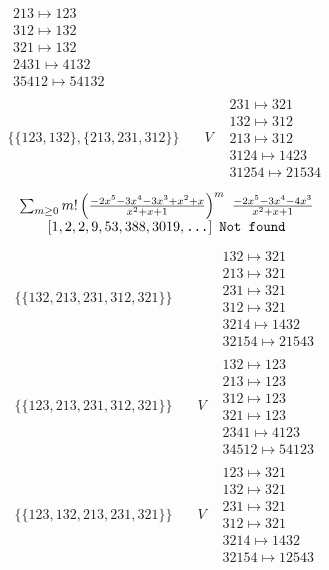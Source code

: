 \begin{tiny}
\begin{align}
\begin{matrix}
213 \mapsto 123\\312 \mapsto 132\\321 \mapsto 132\\2431 \mapsto 4132\\35412 \mapsto 54132
\end{matrix}
\\
\{\{123, 132\}, \{213, 231, 312\}\}
\quad
&
V
&
\begin{matrix}
231 \mapsto 321\\132 \mapsto 312\\213 \mapsto 312\\3124 \mapsto 1423\\31254 \mapsto 21534
\end{matrix}
\end{align}
$$
\begin{matrix}
\sum_{m \geq 0} m! \left(
\frac{-2 x^{5} - 3 x^{4} - 3 x^{3} + x^{2} + x}{x^{2} + x + 1}
\right)^m
\ 
\frac{-2 x^{5} - 3 x^{4} - 4 x^{3}}{x^{2} + x + 1}
\\
\left[1, 2, 2, 9, 53, 388, 3019, \text{\texttt{...}}\right]
\ 
\texttt{Not found}
\end{matrix}
$$
\vspace{-1em}
\begin{align}
\{\{132, 213, 231, 312, 321\}\}
\quad
&
\phantom{.}
&
\begin{matrix}
132 \mapsto 321\\213 \mapsto 321\\231 \mapsto 321\\312 \mapsto 321\\3214 \mapsto 1432\\32154 \mapsto 21543
\end{matrix}
\\
\{\{123, 213, 231, 312, 321\}\}
\quad
&
V
&
\begin{matrix}
132 \mapsto 123\\213 \mapsto 123\\312 \mapsto 123\\321 \mapsto 123\\2341 \mapsto 4123\\34512 \mapsto 54123
\end{matrix}
\\
\{\{123, 132, 213, 231, 321\}\}
\quad
&
V
&
\begin{matrix}
123 \mapsto 321\\132 \mapsto 321\\231 \mapsto 321\\312 \mapsto 321\\3214 \mapsto 1432\\32154 \mapsto 12543

\end{matrix}
\end{align}
\end{tiny}
